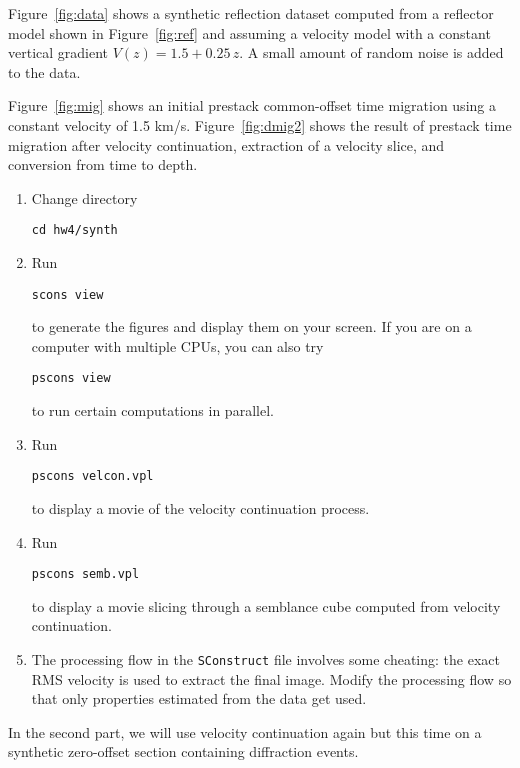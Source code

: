 Figure~\ref{fig:data} shows a synthetic reflection dataset computed
from a reflector model shown in Figure~\ref{fig:ref} and assuming a
velocity model with a constant vertical gradient $V(z) = 1.5 +
0.25\,z$. A small amount of random noise is added to the data.

Figure~\ref{fig:mig} shows an initial prestack common-offset time
migration using a constant velocity of 1.5 km/s. 
Figure~\ref{fig:dmig2} shows the result of prestack time
migration after velocity continuation, extraction of a velocity slice,
and conversion from time to depth.

\begin{enumerate}
\item Change directory 
\begin{verbatim}
cd hw4/synth
\end{verbatim}
\item Run
\begin{verbatim}
scons view
\end{verbatim}
to generate the figures and display them on your screen.
If you are on a computer with multiple CPUs, you
can also try
\begin{verbatim}
pscons view
\end{verbatim}
to run certain computations in parallel.
\item Run 
\begin{verbatim}
pscons velcon.vpl
\end{verbatim}
to display a movie of the velocity continuation process.
\item Run 
\begin{verbatim}
pscons semb.vpl
\end{verbatim}
to display a movie slicing through a semblance cube computed from
velocity continuation.
\item The processing flow in the \texttt{SConstruct} file involves
  some cheating: the exact RMS velocity is used to extract the final
  image. Modify the processing flow so that only properties estimated
  from the data get used. 
\end{enumerate}

\lstset{language=python,numbers=left,numberstyle=\tiny,showstringspaces=false}
{\small	}

\item In the second part, we will use velocity continuation again but
  this time on a synthetic zero-offset section containing diffraction events.

